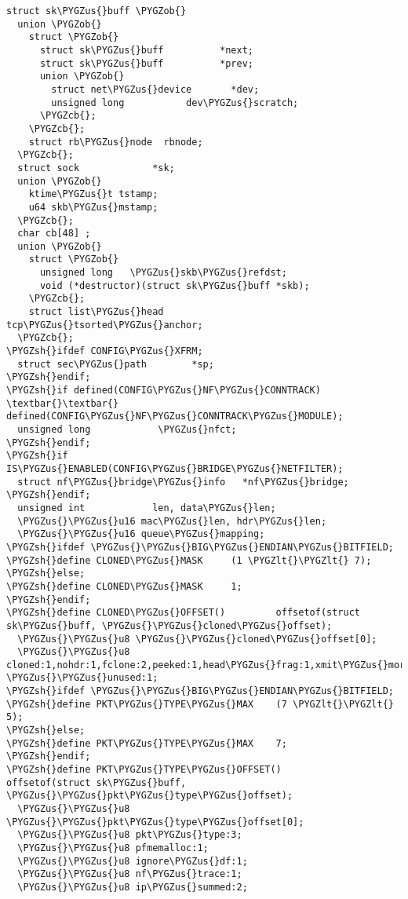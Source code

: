 \documentclass[a4paper,8pt,english]{sphinxmanual}
\def\PYGZus{\char`\_}
\def\PYGZob{\char`\{}
\def\PYGZcb{\char`\}}
\def\PYGZlt{\char`\<}
\def\PYGZsh{\char`\#}
\begin{document}
\begin{Verbatim}[commandchars=\\\{\}]
struct sk\PYGZus{}buff \PYGZob{}
  union \PYGZob{}
    struct \PYGZob{}
      struct sk\PYGZus{}buff          *next;
      struct sk\PYGZus{}buff          *prev;
      union \PYGZob{}
        struct net\PYGZus{}device       *dev;
        unsigned long           dev\PYGZus{}scratch;
      \PYGZcb{};
    \PYGZcb{};
    struct rb\PYGZus{}node  rbnode;
  \PYGZcb{};
  struct sock             *sk;
  union \PYGZob{}
    ktime\PYGZus{}t tstamp;
    u64 skb\PYGZus{}mstamp;
  \PYGZcb{};
  char cb[48] ;
  union \PYGZob{}
    struct \PYGZob{}
      unsigned long   \PYGZus{}skb\PYGZus{}refdst;
      void (*destructor)(struct sk\PYGZus{}buff *skb);
    \PYGZcb{};
    struct list\PYGZus{}head        tcp\PYGZus{}tsorted\PYGZus{}anchor;
  \PYGZcb{};
\PYGZsh{}ifdef CONFIG\PYGZus{}XFRM;
  struct sec\PYGZus{}path        *sp;
\PYGZsh{}endif;
\PYGZsh{}if defined(CONFIG\PYGZus{}NF\PYGZus{}CONNTRACK) \textbar{}\textbar{} defined(CONFIG\PYGZus{}NF\PYGZus{}CONNTRACK\PYGZus{}MODULE);
  unsigned long            \PYGZus{}nfct;
\PYGZsh{}endif;
\PYGZsh{}if IS\PYGZus{}ENABLED(CONFIG\PYGZus{}BRIDGE\PYGZus{}NETFILTER);
  struct nf\PYGZus{}bridge\PYGZus{}info   *nf\PYGZus{}bridge;
\PYGZsh{}endif;
  unsigned int            len, data\PYGZus{}len;
  \PYGZus{}\PYGZus{}u16 mac\PYGZus{}len, hdr\PYGZus{}len;
  \PYGZus{}\PYGZus{}u16 queue\PYGZus{}mapping;
\PYGZsh{}ifdef \PYGZus{}\PYGZus{}BIG\PYGZus{}ENDIAN\PYGZus{}BITFIELD;
\PYGZsh{}define CLONED\PYGZus{}MASK     (1 \PYGZlt{}\PYGZlt{} 7);
\PYGZsh{}else;
\PYGZsh{}define CLONED\PYGZus{}MASK     1;
\PYGZsh{}endif;
\PYGZsh{}define CLONED\PYGZus{}OFFSET()         offsetof(struct sk\PYGZus{}buff, \PYGZus{}\PYGZus{}cloned\PYGZus{}offset);
  \PYGZus{}\PYGZus{}u8 \PYGZus{}\PYGZus{}cloned\PYGZus{}offset[0];
  \PYGZus{}\PYGZus{}u8 cloned:1,nohdr:1,fclone:2,peeked:1,head\PYGZus{}frag:1,xmit\PYGZus{}more:1, \PYGZus{}\PYGZus{}unused:1;
\PYGZsh{}ifdef \PYGZus{}\PYGZus{}BIG\PYGZus{}ENDIAN\PYGZus{}BITFIELD;
\PYGZsh{}define PKT\PYGZus{}TYPE\PYGZus{}MAX    (7 \PYGZlt{}\PYGZlt{} 5);
\PYGZsh{}else;
\PYGZsh{}define PKT\PYGZus{}TYPE\PYGZus{}MAX    7;
\PYGZsh{}endif;
\PYGZsh{}define PKT\PYGZus{}TYPE\PYGZus{}OFFSET()       offsetof(struct sk\PYGZus{}buff, \PYGZus{}\PYGZus{}pkt\PYGZus{}type\PYGZus{}offset);
  \PYGZus{}\PYGZus{}u8 \PYGZus{}\PYGZus{}pkt\PYGZus{}type\PYGZus{}offset[0];
  \PYGZus{}\PYGZus{}u8 pkt\PYGZus{}type:3;
  \PYGZus{}\PYGZus{}u8 pfmemalloc:1;
  \PYGZus{}\PYGZus{}u8 ignore\PYGZus{}df:1;
  \PYGZus{}\PYGZus{}u8 nf\PYGZus{}trace:1;
  \PYGZus{}\PYGZus{}u8 ip\PYGZus{}summed:2;

\end{Verbatim}
\end{document}
